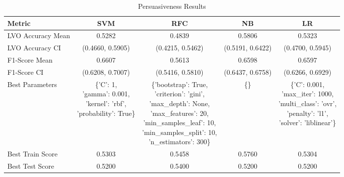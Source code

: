 \begin{table}[h!]
\centering
\begin{tabular}{|l|c|c|c|c|}
\hline
\textbf{Metric}           & \textbf{SVM}    & \textbf{RFC}    & \textbf{NB}     & \textbf{LR}     \\ \hline
LVO Accuracy Mean         & 0.5282          & 0.4839          & 0.5806          & 0.5323          \\ \hline
LVO Accuracy CI           & (0.4660, 0.5905)& (0.4215, 0.5462)& (0.5191, 0.6422)& (0.4700, 0.5945)\\ \hline
F1-Score Mean             & 0.6607          & 0.5613          & 0.6598          & 0.6597          \\ \hline
F1-Score CI               & (0.6208, 0.7007)& (0.5416, 0.5810)& (0.6437, 0.6758)& (0.6266, 0.6929)\\ \hline
Best Parameters           & \makecell[l]{\{'C': 1,\\ 'gamma': 0.001,\\ 'kernel': 'rbf',\\ 'probability': True\}} & \makecell[l]{\{'bootstrap': True,\\ 'criterion': 'gini',\\ 'max\_depth': None,\\ 'max\_features': 20,\\ 'min\_samples\_leaf': 10,\\ 'min\_samples\_split': 10,\\ 'n\_estimators': 300\}} & \{\} & \makecell[l]{\{'C': 0.001,\\ 'max\_iter': 1000,\\ 'multi\_class': 'ovr',\\ 'penalty': 'l1',\\ 'solver': 'liblinear'\}} \\ \hline
Best Train Score          & 0.5303          & 0.5458          & 0.5760          & 0.5304          \\ \hline
Best Test Score           & 0.5200          & 0.5400          & 0.5200          & 0.5200          \\ \hline
\end{tabular}
\caption{Persuasiveness Results}
\label{table:persuasiveness}
\end{table}
